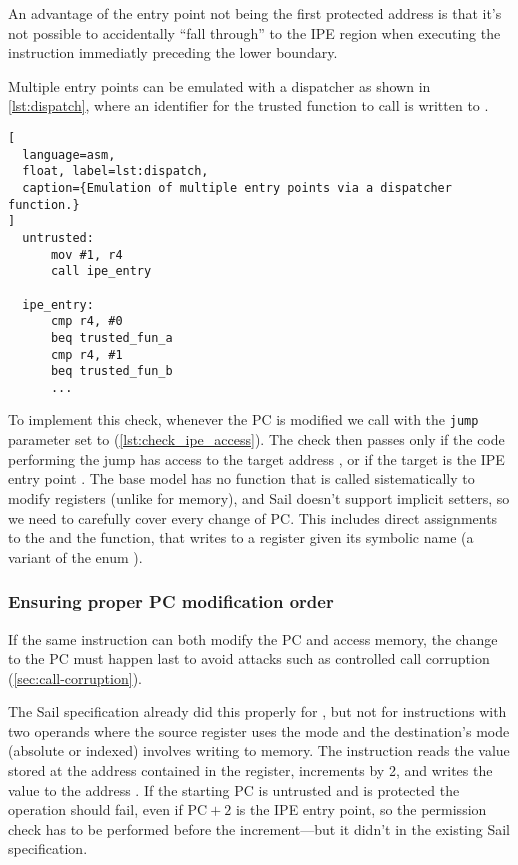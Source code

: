 An advantage of the entry point not being the first protected address is that it's not possible to accidentally ``fall through'' to the IPE region when executing the instruction immediatly preceding the lower boundary.

Multiple entry points can be emulated with a dispatcher as shown in \cref{lst:dispatch}, where an identifier for the trusted function to call is written to .

\begin{lstlisting}[
  language=asm,
  float, label=lst:dispatch,
  caption={Emulation of multiple entry points via a dispatcher function.}
]
  untrusted:
      mov #1, r4
      call ipe_entry

  ipe_entry:
      cmp r4, #0
      beq trusted_fun_a
      cmp r4, #1
      beq trusted_fun_b
      ...
\end{lstlisting}

To implement this check, whenever the PC is modified we call  with the \texttt{jump} parameter set to  (\cref{lst:check_ipe_access}). The check then passes only if the code performing the jump has access to the target address , or if the target is the IPE entry point . The base model has no function that is called sistematically to modify registers (unlike  for memory), and Sail doesn't support implicit setters, so we need to carefully cover every change of PC. This includes direct assignments to the   and the  function, that writes to a register given its symbolic name (a variant of the enum ).

\subsubsection{Ensuring proper PC modification order}
\label{sec:pc-mod-order}

If the same instruction can both modify the PC and access memory, the change to the PC must happen last to avoid attacks such as controlled call corruption (\cref{sec:call-corruption}).

The Sail specification already did this properly for , but not for instructions with two operands where the source register uses the  mode and the destination's mode (absolute or indexed) involves writing to memory. The instruction  reads the value stored at the address contained in the  register, increments  by 2, and writes the value to the address . If the starting PC is untrusted and  is protected the operation should fail, even if \(\mathrm{PC} + 2\) is the IPE entry point, so the permission check has to be performed before the increment---but it didn't in the existing Sail specification.

